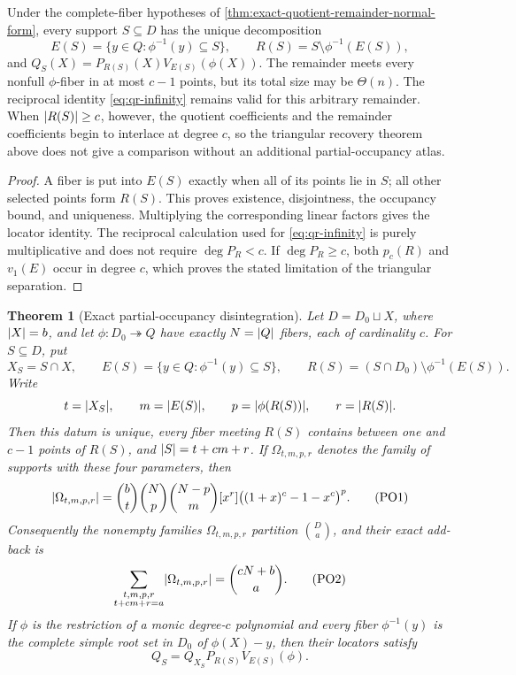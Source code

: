 \documentclass[11pt,a4paper]{amsart}
\numberwithin{equation}{section}
\newtheorem{theorem}{Theorem}[section]
\theoremstyle{remark}
\begin{document}
\begin{proposition}
\label{prop:complete-support-factorization}
Under the complete-fiber hypotheses of
\cref{thm:exact-quotient-remainder-normal-form}, every support
\(S\subseteq D\) has the unique decomposition
\[
 E(S)=\{y\in Q:\phi^{-1}(y)\subseteq S\},\qquad
 R(S)=S\setminus\phi^{-1}(E(S)),
 \tag{QR5a}\label{eq:complete-support-factorization}
\]
and
\(Q_S(X)=P_{R(S)}(X)V_{E(S)}(\phi(X))\).  The remainder meets every
nonfull \(\phi\)-fiber in at most \(c-1\) points, but its total size may
be \(\Theta(n)\).  The reciprocal identity \eqref{eq:qr-infinity} remains
valid for this arbitrary remainder.  When \(\lvert R(S)\rvert\ge c\), however,
the quotient coefficients and the remainder coefficients begin to
interlace at degree \(c\), so the triangular recovery theorem above does
not give a comparison without an additional partial-occupancy atlas.
\end{proposition}

\begin{proof}
A fiber is put into \(E(S)\) exactly when all of its points lie in \(S\);
all other selected points form \(R(S)\).  This proves existence,
disjointness, the occupancy bound, and uniqueness.  Multiplying the
corresponding linear factors gives the locator identity.  The reciprocal
calculation used for \eqref{eq:qr-infinity} is purely multiplicative and
does not require \(\deg P_R<c\).  If \(\deg P_R\ge c\), both
\(p_c(R)\) and \(v_1(E)\) occur in degree \(c\), which proves the stated
limitation of the triangular separation.
\end{proof}

\begin{theorem}[Exact partial-occupancy disintegration]
\label{thm:exact-partial-occupancy}
Let \(D=D_0\sqcup X\), where \(\lvert X\rvert=b\), and let
\(\phi:D_0\twoheadrightarrow Q\) have exactly \(N=\lvert Q\rvert\) fibers, each
of cardinality \(c\).  For \(S\subseteq D\), put
\[
 X_S=S\cap X,\qquad
 E(S)=\{y\in Q:\phi^{-1}(y)\subseteq S\},\qquad
 R(S)=(S\cap D_0)\setminus\phi^{-1}(E(S)).
\]
Write
\[
 t=\lvert X_S\rvert,\qquad m=\lvert E(S)\rvert,\qquad
 p=\lvert \phi(R(S))\rvert,\qquad r=\lvert R(S)\rvert.
\]
Then this datum is unique, every fiber meeting \(R(S)\) contains between
one and \(c-1\) points of \(R(S)\), and \(\lvert S\rvert=t+cm+r\).  If
\(\Omega_{t,m,p,r}\) denotes the family of supports with these four
parameters, then
\[
 \lvert \Omega_{t,m,p,r}\rvert
 =\binom bt\binom Np\binom{N-p}m
   [x^r]\bigl((1+x)^c-1-x^c\bigr)^p.                 \tag{PO1}
\]
Consequently the nonempty families \(\Omega_{t,m,p,r}\) partition
\(\binom Da\), and their exact add-back is
\[
 \sum_{\substack{t,m,p,r\\t+cm+r=a}}\lvert \Omega_{t,m,p,r}\rvert
 =\binom{cN+b}{a}.                                   \tag{PO2}
\]
If \(\phi\) is the restriction of a monic degree-\(c\) polynomial and
every fiber \(\phi^{-1}(y)\) is the complete simple root set in \(D_0\)
of \(\phi(X)-y\), then their locators satisfy
\[
             Q_S=Q_{X_S}P_{R(S)}V_{E(S)}(\phi).
\]
\end{theorem}
\end{document}
